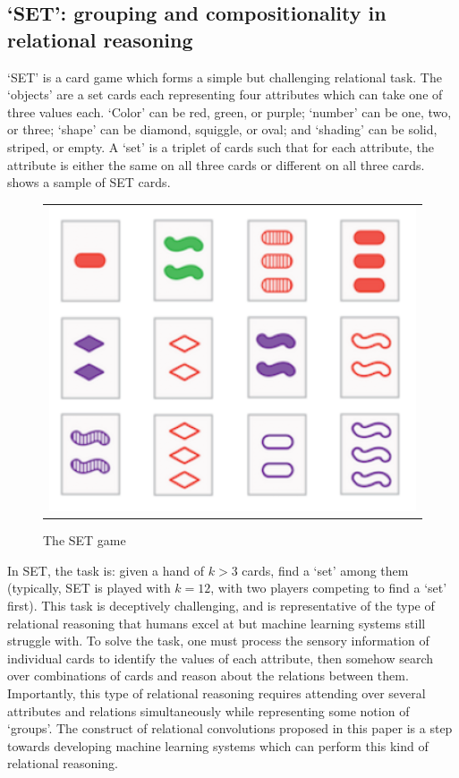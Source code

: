 \subsection{`SET': grouping and compositionality in relational reasoning}\label{ssec:experiments_set}

`SET' is a card game which forms a simple but challenging relational task. The `objects' are a set cards each representing four attributes which can take one of three values each. `Color' can be red, green, or purple; `number' can be one, two, or three; `shape' can be diamond, squiggle, or oval; and `shading' can be solid, striped, or empty. A `set' is a triplet of cards such that for each attribute, the attribute is either the same on all three cards or different on all three cards.~ shows a sample of SET cards.

\begin{figure}
	\vskip-5pt
	\begin{tabular}{c}
		\includegraphics[width=.25\textwidth]{figs/set_example}\\[-5pt]
	\end{tabular}
	\caption{\footnotesize The SET game}\label{fig:set_example}
\end{figure}
In SET, the task is: given a hand of $k > 3$ cards, find a `set' among them (typically, SET is played with $k=12$, with two players competing to find a `set' first). This task is deceptively challenging, and is representative of the type of relational reasoning that humans excel at but machine learning systems still struggle with. To solve the task, one must process the sensory information of individual cards to identify the values of each attribute, then somehow search over combinations of cards and reason about the relations between them. Importantly, this type of relational reasoning requires attending over several attributes and relations simultaneously while representing some notion of `groups'.  The construct of relational convolutions proposed in this paper is a step towards developing machine learning systems which can perform this kind of relational reasoning.


